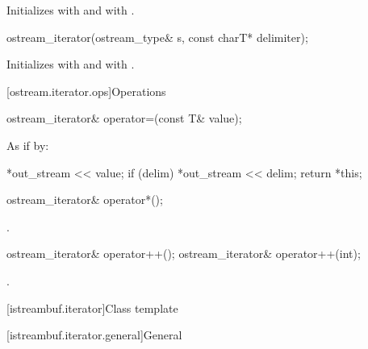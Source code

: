 \begin{itemdescr}
\pnum
\effects
Initializes  with  and
 with .
\end{itemdescr}


%
\begin{itemdecl}
ostream_iterator(ostream_type& s, const charT* delimiter);
\end{itemdecl}

\begin{itemdescr}
\pnum
\effects
Initializes  with  and
 with .
\end{itemdescr}

[ostream.iterator.ops]{Operations}

%
\begin{itemdecl}
ostream_iterator& operator=(const T& value);
\end{itemdecl}

\begin{itemdescr}
\pnum
\effects
As if by:
\begin{codeblock}
*out_stream << value;
if (delim)
  *out_stream << delim;
return *this;
\end{codeblock}
\end{itemdescr}

%
\begin{itemdecl}
ostream_iterator& operator*();
\end{itemdecl}

\begin{itemdescr}
\pnum
\returns
{}.
\end{itemdescr}

%
\begin{itemdecl}
ostream_iterator& operator++();
ostream_iterator& operator++(int);
\end{itemdecl}

\begin{itemdescr}
\pnum
\returns
{}.
\end{itemdescr}

[istreambuf.iterator]{Class template }

[istreambuf.iterator.general]{General}

